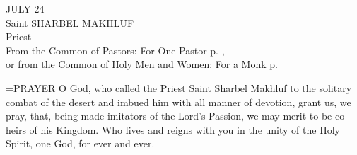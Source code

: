 \begin{center}\normalsize JULY 24\\
\footnotesize Saint SHARBEL MAKHLUF\\
\footnotesize Priest\\
\footnotesize From the Common of Pastors: For One Pastor p.    , \\
\footnotesize or from the Common of Holy Men and Women: For a Monk  p.\\
\end{center}

\hangindent=\parindent \small{PRAYER 
O God, who called the Priest Saint Sharbel Makhlūf
to the solitary combat of the desert
and imbued him with all manner of devotion,
grant us, we pray,
that, being made imitators of the Lord's Passion,
we may merit to be co-heirs of his Kingdom.
Who lives and reigns with you in the unity of the Holy Spirit,
one God, for ever and ever.\\}
 

